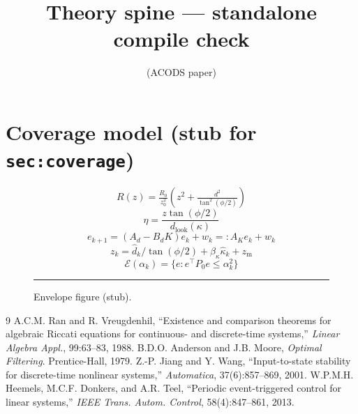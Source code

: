 \documentclass[10pt]{article}
\title{Theory spine --- standalone compile check}
\author{(ACODS paper)}
\date{}
\begin{document}
\maketitle

\section{Coverage model (stub for \texttt{sec:coverage})}\label{sec:coverage}\label{sec:results}\label{sec:method}
\begin{equation} R(z)=\tfrac{R_0}{z_0^2}\!\left(z^2+\tfrac{d^2}{\tan^2(\phi/2)}\right)\label{eq:Rgsd}\end{equation}
\begin{equation} \eta=\frac{z\tan(\phi/2)}{d_{\mathrm{look}}(\kappa)}\label{eq:eta}\end{equation}
\begin{equation} e_{k+1}=(A_d-B_dK)e_k+w_k=:A_Ke_k+w_k\label{eq:error_dynamics}\end{equation}
\begin{equation} z_k=\hat d_k/\tan(\phi/2)+\beta_\kappa\hat\kappa_k+z_{\mathrm m}\label{eq:altpol}\end{equation}
\begin{equation} \mathcal{E}(\alpha_k)=\{e:e^\top P_0 e\le\alpha_k^2\}\label{eq:surrogate}\end{equation}
\begin{figure}[h]\centering\rule{3cm}{1.2cm}\caption{Envelope figure (stub).}\label{fig:envelope}\end{figure}



\begin{thebibliography}{9}
 A.C.M. Ran and R. Vreugdenhil, ``Existence and comparison theorems for algebraic Riccati equations for continuous- and discrete-time systems,'' \emph{Linear Algebra Appl.}, 99:63--83, 1988.
 B.D.O. Anderson and J.B. Moore, \emph{Optimal Filtering}. Prentice-Hall, 1979.
 Z.-P. Jiang and Y. Wang, ``Input-to-state stability for discrete-time nonlinear systems,'' \emph{Automatica}, 37(6):857--869, 2001.
 W.P.M.H. Heemels, M.C.F. Donkers, and A.R. Teel, ``Periodic event-triggered control for linear systems,'' \emph{IEEE Trans. Autom. Control}, 58(4):847--861, 2013.
\end{thebibliography}
\end{document}
